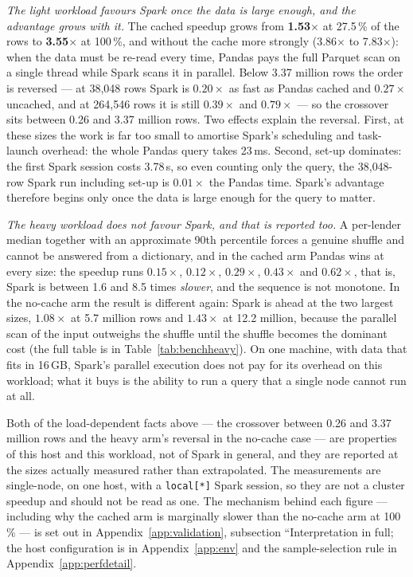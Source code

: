 \documentclass[sigconf,balance=false]{acmart}
\begin{document}
\emph{The light workload favours Spark once the data is large enough, and
the advantage grows with it.} The cached speedup grows from
\textbf{1.53$\times$} at 27.5\,\% of the rows to \textbf{3.55$\times$} at
100\,\%, and without the cache more strongly (3.86$\times$ to
7.83$\times$): when the data must be re-read every time, Pandas pays the
full Parquet scan on a single thread while Spark scans it in parallel.
Below 3.37 million rows the order is reversed --- at 38{,}048 rows Spark
is $0.20\times$ as fast as Pandas cached and $0.27\times$ uncached, and
at 264{,}546 rows it is still $0.39\times$ and $0.79\times$ --- so the
crossover sits between 0.26 and 3.37 million rows. Two effects explain
the reversal. First, at these sizes the work is far too small to amortise
Spark's scheduling and task-launch overhead: the whole Pandas query takes
23\,ms. Second, set-up dominates: the first Spark session costs
3.78\,s, so even counting only the query, the 38{,}048-row Spark run
including set-up is $0.01\times$ the Pandas time. Spark's advantage
therefore begins only once the data is large enough for the query to
matter.

\emph{The heavy workload does not favour Spark, and that is reported too.}
A per-lender median together with an approximate 90th percentile forces a
genuine shuffle and cannot be answered from a dictionary, and in the cached
arm Pandas wins at every size: the speedup runs $0.15\times$,
$0.12\times$, $0.29\times$, $0.43\times$ and $0.62\times$, that is,
Spark is between 1.6 and 8.5 times \emph{slower}, and the sequence is not
monotone. In the no-cache arm the result is different again: Spark is
ahead at the two largest sizes, $1.08\times$ at 5.7 million rows and
$1.43\times$ at 12.2 million, because the parallel scan of the input
outweighs the shuffle until the shuffle becomes the dominant cost (the
full table is in Table~\ref{tab:benchheavy}). On one machine, with data
that fits in 16\,GB, Spark's parallel execution does not pay for its
overhead on this workload; what it buys is the ability to run a query
that a single node cannot run at all.

Both of the load-dependent facts above --- the crossover between 0.26 and
3.37 million rows and the heavy arm's reversal in the no-cache case --- are
properties of this host and this workload, not of Spark in general, and
they are reported at the sizes actually measured rather than extrapolated.
The measurements are single-node, on one host, with a \texttt{local[*]}
Spark session, so they are not a cluster speedup and should not be read as
one. The mechanism behind each figure --- including why the cached arm is
marginally slower than the no-cache arm at 100\,\% --- is set out in
Appendix~\ref{app:validation}, subsection ``Interpretation in full; the
host configuration is in Appendix~\ref{app:env} and the sample-selection
rule in Appendix~\ref{app:perfdetail}.
\end{document}
